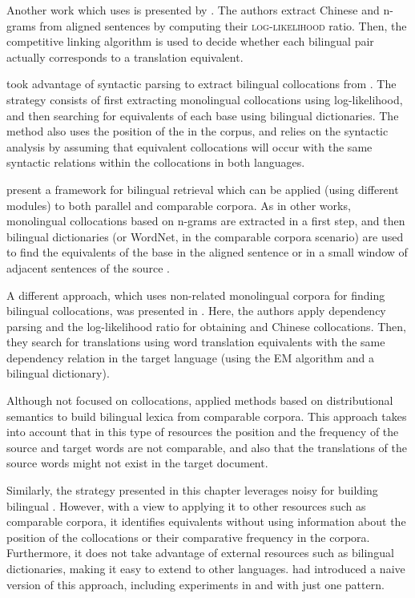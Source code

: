 \documentclass[output=paper,modfonts,nonflat]{langsci/langscibook}
\begin{document}
Another work which uses  is presented by \citet{wu2003}. The authors
extract Chinese and  n-grams from aligned sentences by computing their \textsc{log-likelihood} ratio.
Then, the competitive linking algorithm is used to decide whether each bilingual pair actually
corresponds to a translation equivalent.

\citet{seretan2007} took advantage of syntactic parsing to extract bilingual collocations from .
The strategy consists of first extracting monolingual collocations using log-likelihood,
and then searching for equivalents of each base using bilingual dictionaries.
The method also uses the position of the  in the corpus, and relies on the syntactic analysis
by assuming that equivalent collocations will occur with the same syntactic relations within the collocations in both languages.

\citet{Rivera2013} present a framework for bilingual  retrieval
which can be applied (using different modules) to both parallel and comparable corpora.
As in other works, monolingual collocations based on n-grams are extracted in a first
step, and then bilingual dictionaries (or WordNet, in the comparable corpora scenario) are used
to find the equivalents of the base in the aligned sentence or in a small window of
adjacent sentences of the source .

A different approach, which uses non-related monolingual corpora for finding bilingual
collocations, was presented in \citet{lu2004}. Here, the authors apply dependency parsing
and the log-likelihood ratio for obtaining  and Chinese collocations. Then,
they search for translations using word translation equivalents with the same dependency
relation in the target language (using the EM algorithm and a bilingual dictionary).

Although not focused on collocations, \citet{fung1998} applied methods based on distributional
semantics to build bilingual lexica from comparable corpora.
This approach takes into account that in this type of resources the position and the frequency
of the source and target words are not comparable, and also that the translations of the source
words might not exist in the target document.

Similarly, the strategy presented in this chapter leverages noisy  for building
bilingual . However, with a view to applying it to other resources such as comparable corpora, it identifies equivalents without using information about the position of the collocations
or their comparative frequency in the corpora. Furthermore, it does not take advantage
of external resources such as bilingual dictionaries, making it easy to extend to other languages.
\citet{pacorbook} had introduced a naive version of this approach, including experiments in  and  with just one  pattern.
\end{document}
